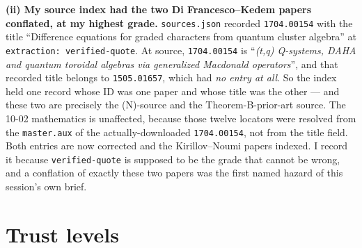 \documentclass[11pt]{article}
\begin{document}
\textbf{(ii) My source index had the two Di Francesco--Kedem papers conflated, at my highest
grade.} \texttt{sources.json} recorded \texttt{1704.00154} with the title ``Difference
equations for graded characters from quantum cluster algebra'' at
\texttt{extraction: verified-quote}. At source, \texttt{1704.00154} is ``\emph{(t,q)
Q-systems, DAHA and quantum toroidal algebras via generalized Macdonald operators}'', and
that recorded title belongs to \texttt{1505.01657}, which had \emph{no entry at all}. So the
index held one record whose ID was one paper and whose title was the other --- and these two
are precisely the (N)-source and the Theorem-B-prior-art source. The 10-02 mathematics is
unaffected, because those twelve locators were resolved from the \texttt{master.aux} of the
actually-downloaded \texttt{1704.00154}, not from the title field. Both entries are now
corrected and the Kirillov--Noumi papers indexed. I record it because \texttt{verified-quote}
is supposed to be the grade that cannot be wrong, and a conflation of exactly these two papers
was the first named hazard of this session's own brief.

\section{Trust levels}
\end{document}
